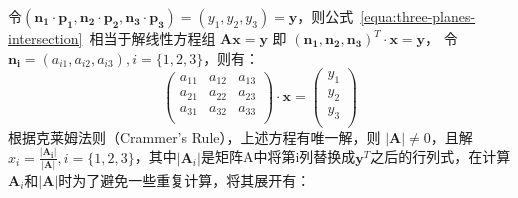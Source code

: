 令$(\bm{n_1} \cdot \bm{p_1}, \bm{n_2} \cdot \bm{p_2}, \bm{n_3} \cdot \bm{p_3})
= (y_1, y_2, y_3) = \bm{y}$，则公式~\ref{equa:three-planes-intersection}~相当于解线性方程组
$\bm{A} \bm{x}=\bm{y}$ 即 $(\bm{n_1},\bm{n_2}, \bm{n_3})^T \cdot \bm{x} = \bm{y}$， 令
$\bm{n_i} = (a_{i1}, a_{i2}, a_{i3}), i=\{1,2,3\}$，则有：
\begin{equation*}
  \label{equa:matrix:crammer}
  \left(
    \begin{array}{ccc}
      a_{11} & a_{12} & a_{13} \\
      a_{21} & a_{22} & a_{23} \\
      a_{31} & a_{32} & a_{33} \\
    \end{array}
  \right)
  \cdot 
  \bm{x} 
  =
  \left(
    \begin{array}{c}
      y_{1} \\
      y_{2} \\
      y_{3} \\
    \end{array}
  \right)
\end{equation*}
根据克莱姆法则（Crammer's Rule），上述方程有唯一解，则
$|\bm{A}| \not= 0$，且解~$x_i = \frac{|\bm{A_i}|}{|\bm{A}|}, i =
\{1,2,3\}$，其中$|\bm{A}_i|$是矩阵A中将第i列替换成$\bm{y}^T$之后的行列式，在计算$\bm{A}_i$和$|\bm{A}|$时为了避免一些重复计算，将其展开有：

